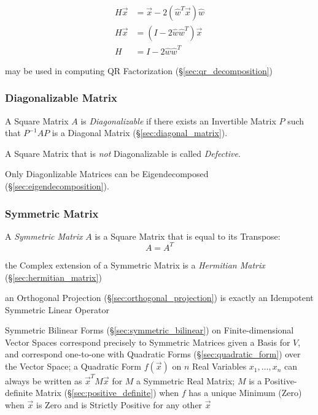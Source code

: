 \begin{align*}
  H\vec{x} & = \vec{x} - 2(\hat{w}^T\vec{x})\hat{w} \\
  H\vec{x} & = (I - 2\hat{w}\hat{w}^T)\vec{x}       \\
         H & = I - 2\hat{w}\hat{w}^T
\end{align*}

\fist may be used in computing QR Factorization (\S\ref{sec:qr_decomposition})



\subsubsection{Diagonalizable Matrix}\label{sec:diagonalizable_matrix}

A Square Matrix $A$ is \emph{Diagonalizable} if there exists an Invertible
Matrix $P$ such that $P^{-1}AP$ is a Diagonal Matrix
(\S\ref{sec:diagonal_matrix}).

A Square Matrix that is \emph{not} Diagonalizable is called \emph{Defective}.

Only Diagonlizable Matrices can be Eigendecomposed
(\S\ref{sec:eigendecomposition}).



\subsubsection{Symmetric Matrix}\label{sec:symmetric_matrix}

A \emph{Symmetric Matrix} $A$ is a Square Matrix that is equal to its
Transpose:
\[
  A = A^T
\]

the Complex extension of a Symmetric Matrix is a \emph{Hermitian Matrix}
(\S\ref{sec:hermitian_matrix})

an Orthogonal Projection (\S\ref{sec:orthogonal_projection}) is exactly an
Idempotent Symmetric Linear Operator

Symmetric Bilinear Forms (\S\ref{sec:symmetric_bilinear}) on
Finite-dimensional Vector Spaces correspond precisely to Symmetric Matrices
given a Basis for $V$, and correspond one-to-one with Quadratic Forms
(\S\ref{sec:quadratic_form}) over the Vector Space;
a Quadratic Form $f(\vec{x})$ on $n$ Real Variables $x_1,\ldots,x_n$ can always
be written as $\vec{x}^T M \vec{x}$ for $M$ a Symmetric Real Matrix; $M$ is a
Positive-definite Matrix (\S\ref{sec:positive_definite}) when $f$ has a unique
Minimum (Zero) when $\vec{x}$ is Zero and is Strictly Positive for any other
$\vec{x}$

